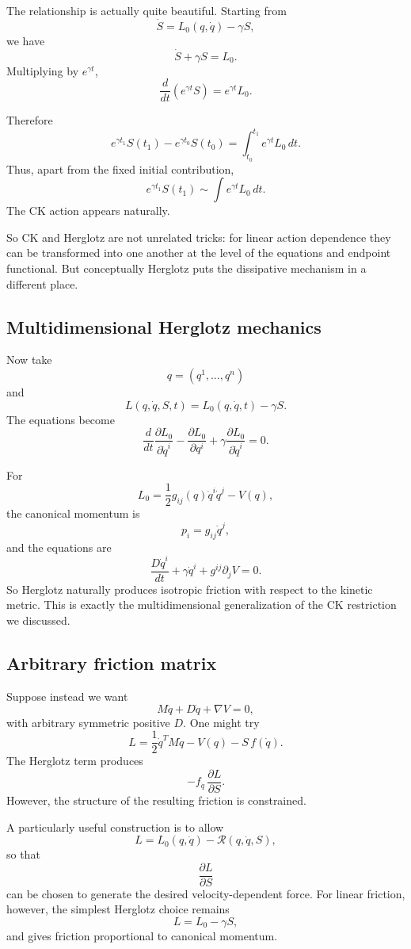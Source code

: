 The relationship is actually quite beautiful.
Starting from $$ \dot S = L_0(q,\dot q)-\gamma S, $$
we have $$ \dot S+\gamma S=L_0. $$
Multiplying by \(e^{\gamma t}\),
$$ \frac{d}{dt}\left(e^{\gamma t}S\right) = e^{\gamma t}L_0. $$

Therefore
$$ e^{\gamma t_1}S(t_1) - e^{\gamma t_0}S(t_0) = \int_{t_0}^{t_1} e^{\gamma t}L_0\,dt. $$
Thus, apart from the fixed initial contribution,
$$ \boxed{ e^{\gamma t_1}S(t_1) \sim \int e^{\gamma t}L_0\,dt. } $$
The CK action appears naturally.

So CK and Herglotz are not unrelated tricks: for linear action dependence they can be transformed into one another at the level of the equations and endpoint functional.
But conceptually Herglotz puts the dissipative mechanism in a different place.

\subsection{Multidimensional Herglotz mechanics}

Now take $$ q=(q^1,\ldots,q^n) $$
and $$ \boxed{ L(q,\dot q,S,t) = L_0(q,\dot q,t)-\gamma S. } $$
The equations become
$$ \frac{d}{dt} \frac{\partial L_0}{\partial\dot q^i} - \frac{\partial L_0}{\partial q^i} + \gamma \frac{\partial L_0}{\partial\dot q^i} =0. $$

For $$ L_0 = \frac12g_{ij}(q)\dot q^i\dot q^j - V(q), $$
the canonical momentum is $$ p_i = g_{ij}\dot q^j, $$
and the equations are
$$ \boxed{ \frac{D\dot q^i}{dt} + \gamma\dot q^i + g^{ij}\partial_jV =0. } $$
So Herglotz naturally produces isotropic friction with respect to the kinetic metric.
This is exactly the multidimensional generalization of the CK restriction we discussed.

\subsection{Arbitrary friction matrix}

Suppose instead we want $$ M\ddot q+D\dot q+\nabla V=0, $$
with arbitrary symmetric positive \(D\).
One might try
$$ L= \frac12\dot q^TM\dot q -V(q) -S\,f(\dot q). $$
The Herglotz term produces
$$ -f_{\dot q}\,\frac{\partial L}{\partial S}. $$
However, the structure of the resulting friction is constrained.

A particularly useful construction is to allow
$$ \boxed{ L=L_0(q,\dot q)-\mathcal R(q,\dot q,S), } $$
so that $$ \frac{\partial L}{\partial S} $$
can be chosen to generate the desired velocity-dependent force.
For linear friction, however, the simplest Herglotz choice remains
$$ L=L_0-\gamma S, $$ and gives friction proportional to canonical momentum.

